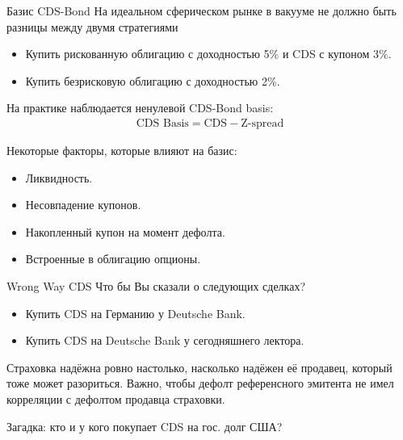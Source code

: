\documentclass{beamer}
\begin{document}
\begin{frame}{Базис CDS-Bond}
\justify
На идеальном сферическом рынке в вакууме не должно быть разницы между двумя стратегиями
\begin{itemize}
\justifying
\item Купить рискованную облигацию с доходностью 5\% и CDS с купоном 3\%.
\item Купить безрисковую облигацию с доходностью 2\%.
\end{itemize}

\justify
На практике наблюдается ненулевой CDS-Bond basis:
\begin{align*}
\text{CDS Basis} = \text{CDS} - \text{Z-spread}
\end{align*}

\justify
Некоторые факторы, которые влияют на базис:
\begin{itemize}
\justifying
\item Ликвидность.
\item Несовпадение купонов.
\item Накопленный купон на момент дефолта.
\item Встроенные в облигацию опционы.
\end{itemize}
\end{frame}



\begin{frame}{Wrong Way CDS}
\justify
Что бы Вы сказали о следующих сделках?
\begin{itemize}
\item Купить CDS на Германию у Deutsche Bank.
\item Купить CDS на Deutsche Bank у сегодняшнего лектора.
\end{itemize}

\justify
Страховка надёжна ровно настолько, насколько надёжен её продавец, который тоже может разориться. Важно, чтобы дефолт референсного эмитента не имел корреляции с дефолтом продавца страховки.

\justify
Загадка: кто и у кого покупает CDS на гос. долг США?
\end{frame}
\end{document}
